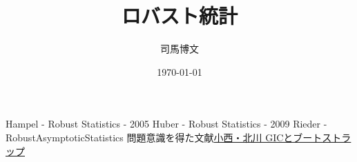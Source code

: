 \documentclass[uplatex,dvipdfmx]{jsreport}
\title{ロバスト統計}
\author{司馬博文}
\date{\today}
\begin{document}
\tableofcontents


\begin{thebibliography}{9}
    Hampel - Robust Statistics - 2005
    Huber - Robust Statistics - 2009
    Rieder - RobustAsymptoticStatistics
    問題意識を得た文献\href{https://www.ism.ac.jp/editsec/toukei/pdf/47-2-375.pdf}{小西・北川 GICとブートストラップ}
\end{thebibliography}
\end{document}
